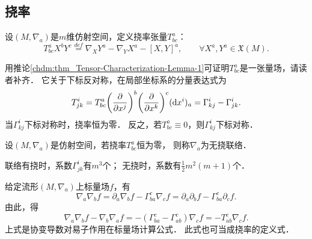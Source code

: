 \subsection{挠率}\label{chccr:sec_torsion}
\begin{definition}
    设$(M,\nabla_a)$是$m$维仿射空间，定义挠率张量$T_{bc}^a$：
    \begin{equation}\label{chccr:eqn_Ttorsion}
        T_{bc}^a{X^b}{Y^c} \overset{def}{=} {\nabla _X}{Y^a} - {\nabla _Y}{X^a} - {\left[ {X,Y} \right]^a} ,
        \qquad \forall X^a, Y^a \in \mathfrak{X}(M) .
    \end{equation}
\end{definition}
用推论\ref{chdm:thm_Tensor-Characterization-Lemma-1}可证明$T_{bc}^a$是一张量场，请读者补齐．
它关于下标反对称，在局部坐标系的分量表达式为
\begin{equation}\label{chccr:eqn_Ttorsion-comp}
    T_{jk}^i=T_{bc}^a{\left(\frac{\partial}{\partial x^j}\right)^b}
    {\left(\frac{\partial}{\partial x^k}\right)^c}
    ({\rm d} x^i)_a = \Gamma^{i}_{kj} - \Gamma^{i}_{jk} .
\end{equation}
当$\Gamma^{i}_{kj}$下标对称时，挠率恒为零．
反之，若$T_{bc}^a\equiv 0$，则$\Gamma^{i}_{kj}$下标对称．
\begin{definition}
    设$(M,\nabla_a)$是仿射空间，若挠率$T_{bc}^a$恒为零，
    则称$\nabla_a$为{\heiti 无挠联络}．
\end{definition}

\begin{remark}\label{chccr:remark_connection-coef-num}
    联络有挠时，系数$\Gamma^{i}_{jk}$有$m^3$个；
    无挠时，系数有$\frac{1}{2}m^2(m+1)$个．
\end{remark}


给定流形$(M,\nabla_a)$上标量场$f$，有
\begin{equation}
    \nabla_a\nabla_b f= \partial_a\nabla_b f - \Gamma_{ba}^c \nabla_c f
    = \partial_a\partial_b f - \Gamma_{ba}^c \partial_c f .
\end{equation}
由此，得
\begin{equation}\label{chccr:eqn_scalar-torsion}
    \nabla_a\nabla_b f - \nabla_b\nabla_a f=  - (\Gamma_{ba}^c-\Gamma_{ab}^c) \nabla_c f
    = - T_{ab}^c \nabla_c f .
\end{equation}
上式是协变导数对易子作用在标量场计算公式．
此式也可当成挠率的定义式．






